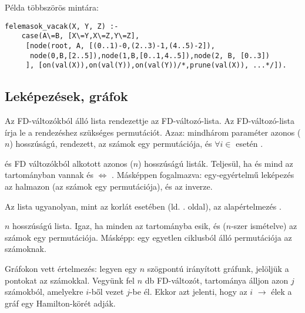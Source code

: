 Példa többszörös mintára: 

\begin{verbatim}
felemasok_vacak(X, Y, Z) :-
    case(A\=B, [X\=Y,X\=Z,Y\=Z],
     [node(root, A, [(0..1)-0,(2..3)-1,(4..5)-2]),
      node(0,B,[2..5]),node(1,B,[0..1,4..5]),node(2, B, [0..3])
     ], [on(val(X)),on(val(Y)),on(val(Y))/*,prune(val(X)), ...*/]).
\end{verbatim}

\subsection{Leképezések, gráfok}

{}

Az  FD-változókból álló lista rendezettje az  FD-változó-lista. Az 
FD-változó-lista írja le a rendezéshez szükséges permutációt. Azaz: mindhárom
paraméter azonos ($n$) hosszúságú,  rendezett,  az  számok
egy permutációja, és $\forall i \in$  esetén .

\medskip

{}

 és  FD változókból alkotott azonos ($n$) hosszúságú listák. Teljesül,
ha  és  mind az  tartományban vannak és 
$\Leftrightarrow$ . Másképpen fogalmazva:  egy-egyértelmű
leképezés az  halmazon (az  számok egy permutációja), és
 az  inverze.

Az  lista ugyanolyan, mint az  korlát
esetében (ld. \pageref{all_distinct}. oldal), az alapértelmezés
.

\medskip

{ }

 $n$ hosszúságú lista. Igaz, ha minden  az 
tartományba esik, és 
($n$-szer ismételve) az  számok egy permutációja. Másképp:  egy
egyetlen ciklusból álló permutációja az  számoknak.

Gráfokon vett értelmezés: legyen egy $n$ szögpontú irányított gráfunk,
jelöljük a pontokat az  számokkal. Vegyünk fel $n$ db FD-változót,
 tartománya álljon azon $j$ számokból, amelyekre $i$-ből vezet $j$-be él.
Ekkor  azt jelenti, hogy az $i$ $\rightarrow$  élek a
gráf egy Hamilton-körét adják.

